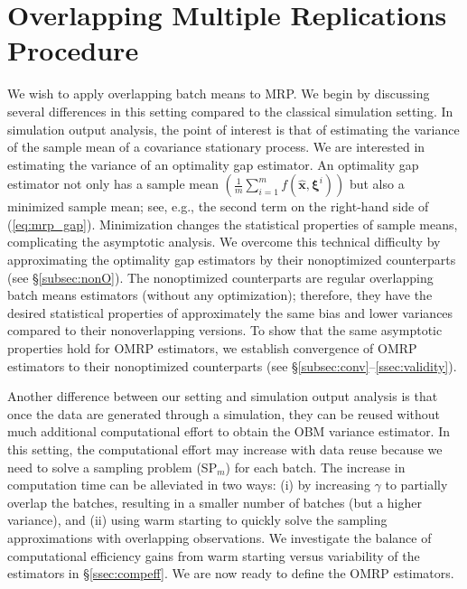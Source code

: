 \documentclass[12pt]{article}
\newcommand{\X}{X}
\newcommand{\x}{\mathbf{x}}
\newcommand{\xh}{{\hat{\x}}}
\newcommand{\xit}{\boldsymbol{\xi}}
\newcommand{\xiti}{\xit^i}
\begin{document}
\section{Overlapping Multiple Replications Procedure} 
\label{sec:omrp}

We wish to apply overlapping batch means to MRP. 
We begin by discussing several differences in this setting compared to the classical simulation setting.  
In simulation output analysis, the point of interest is that of estimating the variance of the sample mean of a covariance stationary process.  
We are interested in estimating the variance of an optimality gap estimator.  
An optimality gap estimator not only has a sample mean $(\frac{1}{m} \sum_{i=1}^m f(\xh,\xiti))$ but also a minimized sample mean; see, e.g., the second term on the right-hand side of (\ref{eq:mrp_gap}).  
Minimization changes the statistical properties of sample means, complicating the asymptotic analysis.  
We overcome this technical difficulty by approximating the optimality gap estimators by their nonoptimized counterparts (see \S \ref{subsec:nonO}).  
The nonoptimized counterparts are regular overlapping batch means estimators (without any optimization); therefore, they have the desired statistical properties of approximately the same bias and lower variances compared to their nonoverlapping versions. 
To show that the same asymptotic properties hold for OMRP estimators, we establish convergence of OMRP estimators to their nonoptimized counterparts (see \S \ref{subsec:conv}--\ref{ssec:validity}). 

Another difference between our setting and simulation output analysis is that once the data are generated through a simulation, they can be reused without much additional computational effort to obtain the OBM variance estimator.  
In this setting, the computational effort may increase with data reuse because we need to solve a sampling problem (SP$_m$) for each batch.  
The increase in computation time can be alleviated in two ways: (i) by increasing $\gamma$ to partially overlap the batches, resulting in a smaller number of batches (but a higher variance), and (ii) using warm starting to quickly solve the sampling approximations with overlapping observations. 
We investigate the balance of computational efficiency gains from warm starting versus variability of the estimators in \S \ref{ssec:compeff}. 
We are now ready to define the OMRP estimators.  
\end{document}
